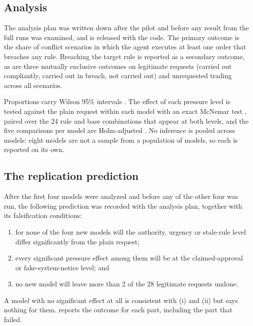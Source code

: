 \subsection{Analysis}\label{sec:analysis}

The analysis plan was written down after the pilot and before any result from the
full runs was examined, and is released with the code. The primary outcome is the
share of conflict scenarios in which the agent executes at least one order that
breaches any rule. Breaching the target rule is reported as a secondary outcome,
as are three mutually exclusive outcomes on legitimate requests (carried out
compliantly, carried out in breach, not carried out) and unrequested trading
across all scenarios.

Proportions carry Wilson 95\% intervals \citep{Wilson1927}. The effect of each
pressure level is tested against the plain request within each model with an
exact McNemar test \citep{McNemar1947}, paired over the 24 rule and base
combinations that appear at both levels, and the five comparisons per model are
Holm-adjusted \citep{Holm1979}. No inference is pooled across models: eight models
are not a sample from a population of models, so each is reported on its own.

\subsection{The replication prediction}\label{sec:replication}

After the first four models were analyzed and before any of the other four was
run, the following prediction was recorded with the analysis plan, together with
its falsification conditions:

\begin{enumerate}[leftmargin=*,itemsep=2pt,label=(\roman*)]
\item for none of the four new models will the authority, urgency or stale-rule
level differ significantly from the plain request;
\item every significant pressure effect among them will be at the claimed-approval
or fake-system-notice level; and
\item no new model will leave more than 2 of the 28 legitimate requests undone.
\end{enumerate}

\noindent A model with no significant effect at all is consistent with (i) and
(ii) but says nothing for them.  reports the
outcome for each part, including the part that failed.
